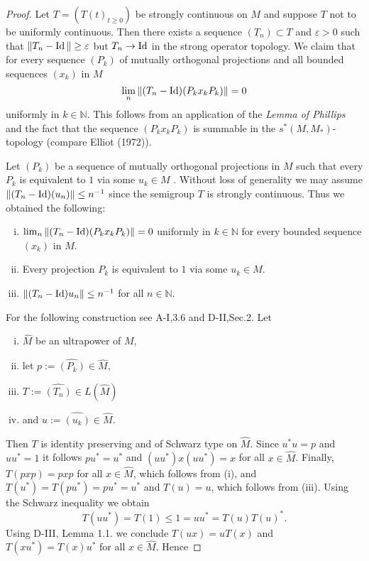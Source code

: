 \begin{proof}
Let $T = (T(t)_{t \geq 0})$ be strongly continuous on $M$ and suppose $T$ not to be uniformly continuous.
Then there exists a sequence $(T_n) \subset T$ and $\varepsilon > 0$ such that $\|T_n - \operatorname{Id}\| \geq \varepsilon$ but $T_n \to \operatorname{Id}$ in the strong operator topology.
We claim that for every sequence $(P_k)$ of mutually orthogonal projections and all bounded sequences $(x_k)$ in $M$
\[
\lim_n \|(T_n - \operatorname{Id})(P_k x_k P_k)\| = 0
\]
uniformly in $k \in \mathbb{N}$.
This follows from an application of the \emph{Lemma of Phillips} and the fact that the sequence $(P_{k} x_{k} P_{k})$ is summable in the $s^{*}(M,M_*)$-topology (compare Elliot (1972)).

Let $(P_k)$ be a sequence of mutually orthogonal projections in $M$ such that every $P_k$ is equivalent to $1$ via some $u_k \in M$ \cite[2.2]{sakai:1971}.
Without loss of generality we may assume $\|(T_n - \operatorname{Id})(u_n)\| \leq n^{-1}$ since the semigroup $T$ is strongly continuous.
Thus we obtained the following:

\begin{enumerate}[(i)]
\item 
$\lim_n \|(T_n - \operatorname{Id})(P_k x_k P_k)\| = 0$ uniformly in $k \in \mathbb{N}$ for every bounded sequence $(x_k)$ in $M$.
\item 
Every projection $P_k$ is equivalent to $1$ via some $u_k \in M$.
\item 
$\|(T_n - \operatorname{Id})u_n\| \leq n^{-1}$ for all $n \in \mathbb{N}$.
\end{enumerate}

For the following construction see A-I,3.6 and D-II,Sec.2.
Let 

\begin{enumerate}[(i)]
\item
$\widehat{M}$ be an ultrapower of $M$,

\item
let $p := \widehat{(P_{k})} \in \widehat{M}$,

\item
$T := \widehat{(T_{n}) }\in L(\widehat{M})$

\item
 and $u := \widehat{(u_{k})}  \in \widehat{M}$.

\end{enumerate}
Then $T$ is identity preserving and of Schwarz type on $\widehat{M}$.
Since $u^*u = p$ and $uu^* = 1$ it follows $pu^* = u^*$ and $(uu^*)x(uu^*) = x$ for all $x \in \widehat{M}$.
Finally, $T(pxp) = pxp$ for all $x \in \widehat{M}$, which follows from (i), and $T(u^*) = T(pu^*) = pu^* = u^*$ and $T(u) = u$, which follows from (iii).
Using the Schwarz inequality we obtain
\[
T(uu^*) = T(1) \leq 1 = uu^* = T(u)T(u)^*.
\]
Using D-III, Lemma 1.1. we conclude $T(ux) = uT(x)$ and $T(xu^*) = T(x)u^*$ for all $x \in \widehat{M}$.
Hence


\end{proof}
